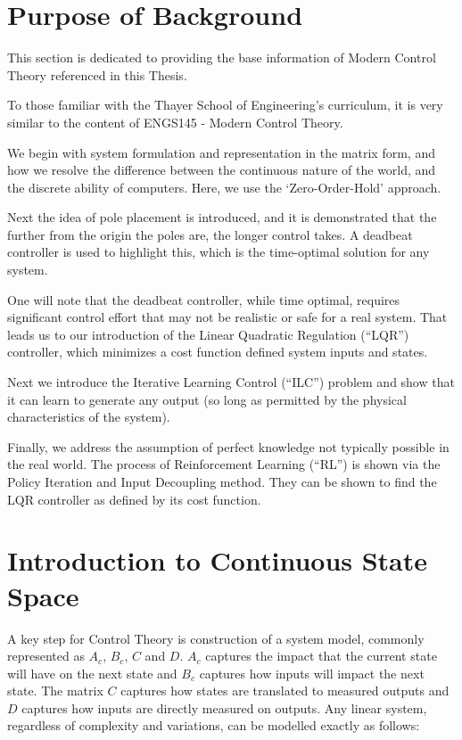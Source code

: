 

\FloatBarrier\section{Purpose of Background} %
This section is dedicated to providing the base information of Modern Control Theory referenced in this Thesis.

To those familiar with the Thayer School of Engineering's curriculum, it is very similar to the content of ENGS145 - Modern Control Theory.

We begin with system formulation and representation in the matrix form, and how we resolve the difference between the continuous nature of the world, and the discrete ability of computers. Here, we use the `Zero-Order-Hold' approach. 

Next the idea of pole placement is introduced, and it is demonstrated that the further from the origin the poles are, the longer control takes. A deadbeat controller is used to highlight this, which is the time-optimal solution for any system.

One will note that the deadbeat controller, while time optimal, requires significant control effort that may not be realistic or safe for a real system. That leads us to our introduction of the Linear Quadratic Regulation (``LQR'') controller, which minimizes a cost function defined system inputs and states. 

Next we introduce the Iterative Learning Control (``ILC'') problem and show that it can learn to generate any output (so long as permitted by the physical characteristics of the system). 

Finally, we address the assumption of perfect knowledge not typically possible in the real world. The process of Reinforcement Learning (``RL'') is shown via the Policy Iteration and Input Decoupling method. They can be shown to find the LQR controller as defined by its cost function. 

\FloatBarrier\section{Introduction to Continuous State Space} %
A key step for Control Theory is construction of a system model, commonly represented as $A_c$, $B_c$, $C$ and $D$. $A_c$ captures the impact that the current state will have on the next state and $B_c$ captures how inputs will impact the next state. The matrix $C$ captures how states are translated to measured outputs and $D$ captures how inputs are directly measured on outputs. Any linear system, regardless of complexity and variations, can be modelled exactly as follows:


